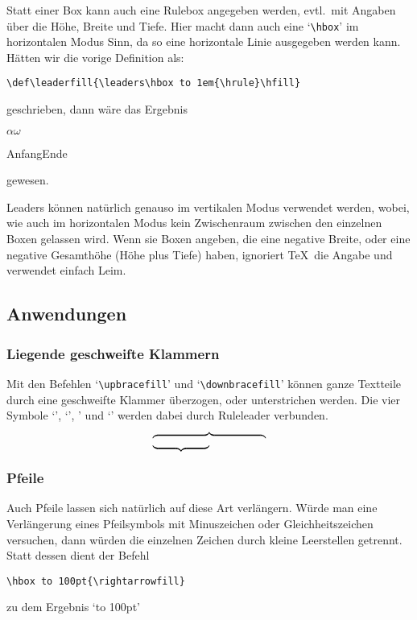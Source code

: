 Statt einer Box kann auch eine Rulebox angegeben werden, evtl.\ mit
Angaben \"uber die 
H\"ohe, Breite und Tiefe. Hier macht dann auch eine
`\verb|\hbox|' im 
horizontalen Modus Sinn, da so eine horizontale
Linie ausgegeben werden kann. H\"atten wir die vorige Definition als:
\begin{verbatim}
\def\leaderfill{\leaders\hbox to 1em{\hrule}\hfill}
\end{verbatim}
geschrieben, dann w\"are das Ergebnis

$\alpha$\hrulefill $\omega$

Anfang\hrulefill Ende

gewesen.

Leaders k\"onnen nat\"urlich genauso im vertikalen Modus verwendet werden,
wobei, wie auch im horizontalen Modus kein 
Zwischenraum zwischen den
einzelnen Boxen gelassen wird. Wenn sie Boxen angeben, die eine
negative Breite, oder eine negative 
Gesamth\"ohe (H\"ohe plus Tiefe)
haben, ignoriert \TeX\ die Angabe und verwendet einfach Leim.

\subsection{Anwendungen}
\subsubsection{Liegende geschweifte Klammern}
Mit den Befehlen
`\verb|\upbracefill|' und 
`\verb|\downbracefill|'
k\"onnen ganze Textteile durch eine geschweifte Klammer \"uberzogen, oder
unterstrichen werden. Die vier Symbole `{\Mf{}}',
`{\Mf{}}', {\Mf{}}' und `{\Mf{}}' werden dabei durch
Ruleleader verbunden.
$$\vbox{\kern4pt
\hbox to 100pt{\downbracefill}\hbox to 50pt{\upbracefill}}$$
\subsubsection{Pfeile}
Auch Pfeile lassen sich nat\"urlich auf diese Art verl\"angern. W\"urde man
eine Verl\"angerung eines Pfeilsymbols mit 
Minuszeichen oder
Gleichheitszeichen versuchen, dann w\"urden die einzelnen Zeichen durch
kleine Leerstellen getrennt. Statt dessen dient der Befehl
\begin{verbatim}
\hbox to 100pt{\rightarrowfill}
\end{verbatim}
zu dem Ergebnis `\hbox to 100pt{\rightarrowfill}'
